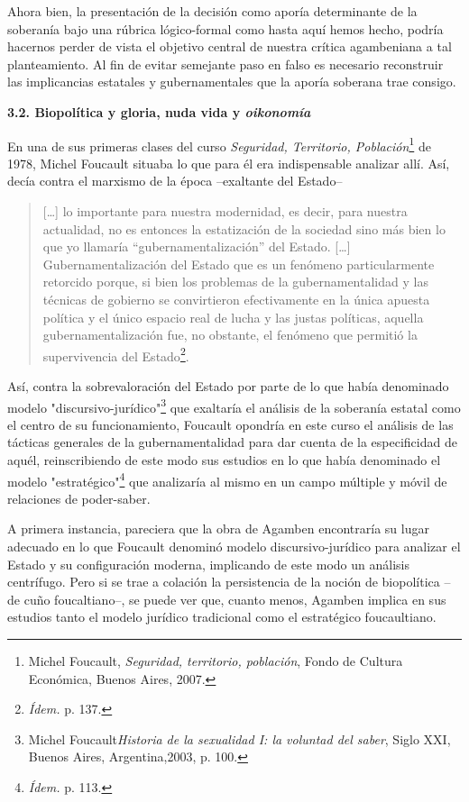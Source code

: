 \documentclass{book}
\begin{document}
Ahora bien, la presentación de la decisión como aporía determinante de
la soberanía bajo una rúbrica lógico-formal como hasta aquí hemos hecho,
podría hacernos perder de vista el objetivo central de nuestra crítica
agambeniana a tal planteamiento. Al fin de evitar semejante paso en
falso es necesario reconstruir las implicancias estatales y
gubernamentales que la aporía soberana trae consigo.

\textbf{3.2. Biopolítica y gloria, nuda vida y \emph{oikonomía}}

En una de sus primeras clases del curso \emph{Seguridad, Territorio,
Población}\footnote{Michel Foucault, \emph{Seguridad, territorio,
  población}, Fondo de Cultura Económica, Buenos Aires, 2007.} de 1978,
Michel Foucault situaba lo que para él era indispensable analizar allí.
Así, decía contra el marxismo de la época --exaltante del Estado--

\begin{quote}
{[}\ldots{]} lo importante para nuestra modernidad, es decir, para
nuestra actualidad, no es entonces la estatización de la sociedad sino
más bien lo que yo llamaría ``gubernamentalización'' del Estado.
{[}\ldots{]} Gubernamentalización del Estado que es un fenómeno
particularmente retorcido porque, si bien los problemas de la
gubernamentalidad y las técnicas de gobierno se convirtieron
efectivamente en la única apuesta política y el único espacio real de
lucha y las justas políticas, aquella gubernamentalización fue, no
obstante, el fenómeno que permitió la supervivencia del
Estado\footnote{\emph{Ídem.} p. 137.}.
\end{quote}

Así, contra la sobrevaloración del Estado por parte de lo que había
denominado modelo "discursivo-jurídico"\footnote{Michel
  Foucault\emph{Historia de la sexualidad I: la voluntad del saber},
  Siglo XXI, Buenos Aires, Argentina,2003, p. 100.} que exaltaría el
análisis de la soberanía estatal como el centro de su funcionamiento,
Foucault opondría en este curso el análisis de las tácticas generales de
la gubernamentalidad para dar cuenta de la especificidad de aquél,
reinscribiendo de este modo sus estudios en lo que había denominado el
modelo "estratégico"\footnote{\emph{Ídem.} p. 113.} que analizaría al
mismo en un campo múltiple y móvil de relaciones de poder-saber.

A primera instancia, pareciera que la obra de Agamben encontraría su
lugar adecuado en lo que Foucault denominó modelo discursivo-jurídico
para analizar el Estado y su configuración moderna, implicando de este
modo un análisis centrífugo. Pero si se trae a colación la persistencia
de la noción de biopolítica --de cuño foucaltiano--, se puede ver que,
cuanto menos, Agamben implica en sus estudios tanto el modelo jurídico
tradicional como el estratégico foucaultiano.
\end{document}

